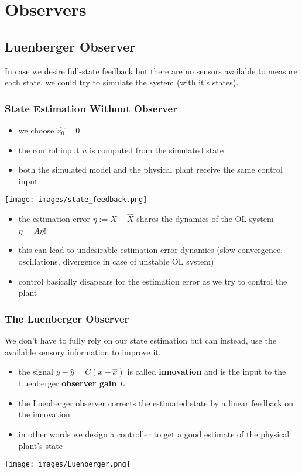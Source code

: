 \section{Observers}
\subsection{Luenberger Observer}
In case we desire full-state feedback but there are no sensors available to measure each state, we could try to simulate the system (with it's states).
\subsubsection{State Estimation Without Observer}
\begin{itemize}
    \item we choose $\hat{x_0}=0$
    \item the control input $u$ is computed from the simulated state
    \item both the simulated model and the physical plant receive the same control input
\end{itemize}
\begin{center}
    \texttt{[image: images/state\_feedback.png]}\\
\end{center}

\begin{itemize}
    \item the estimation error $\eta:=X-\hat{X}$ shares the dynamics of the OL system $\dot{\eta}=A\eta$!
    \item this can lead to undesirable estimation error dynamics (slow convergence, oscillations, divergence in case of unstable OL system)
    \item control basically disapears for the estimation error as we try to control the plant
\end{itemize}

\subsubsection{The Luenberger Observer}
We don't have to fully rely on our state estimation but can instead, use the available sensory information to improve it.
\begin{itemize}
    \item the signal $y-\hat{y}=C(x-\hat{x})$ is called \textbf{innovation} and is the input to the Luenberger \textbf{observer gain} $L$
    \item the Luenberger observer corrects the estimated state by a linear feedback on the innovation
    \item in other words we design a controller to get a good estimate of the physical plant's state
\end{itemize}
\begin{center}
    \texttt{[image: images/Luenberger.png]}
\end{center}

